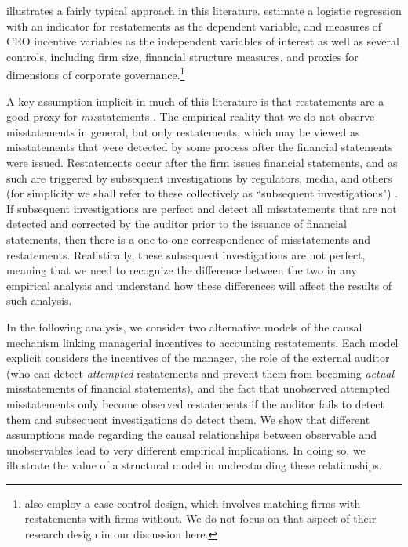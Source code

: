 \citet{Efendi:2007ja} illustrates a fairly typical approach in this literature. 
\citet[p.\,687]{Efendi:2007ja} estimate a logistic regression with an indicator for restatements as the dependent variable, and measures of CEO incentive variables as the independent variables of interest as well as several controls, including firm size, financial structure measures, and proxies for dimensions of corporate governance.\footnote{
\citep{Efendi:2007ja} also employ a case-control design, which involves matching firms with restatements with firms without.
We do not focus on that aspect of their research design in our discussion here.}
 
A key assumption implicit in much of this literature is that restatements are a good proxy for \emph{mis}statements \citep[e.g.,][]{Efendi:2007ja,Armstrong:2010jd}.
The empirical reality that we do not observe misstatements in general, but only restatements, which may be viewed as misstatements that were detected by some process after the financial statements were issued.
Restatements occur after the firm issues financial statements, and as such are triggered by subsequent investigations by regulators, media, and others (for simplicity we shall refer to these collectively as ``subsequent investigations") \citep{Dyck:2010kh}.
If subsequent investigations are perfect and detect all misstatements that are not detected and corrected by the auditor prior to the issuance of financial statements, then there is a one-to-one correspondence of misstatements and restatements. 
Realistically, these subsequent investigations are not perfect, meaning that we need to recognize the difference between the two in any empirical analysis and understand how these differences will affect the results of such analysis.

In the following analysis, we consider two alternative models of the causal mechanism linking managerial incentives to accounting restatements.
Each model explicit considers the incentives of the manager, the role of the external auditor (who can detect \emph{attempted} restatements and prevent them from becoming \emph{actual} misstatements of financial statements), and the fact that unobserved attempted misstatements only become observed restatements if the auditor fails to detect them and subsequent investigations do detect them.
We show that different assumptions made regarding the causal relationships between observable and unobservables lead to very different empirical implications.
In doing so, we illustrate the value of a structural model in understanding these relationships.

